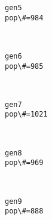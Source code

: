 \documentclass[11pt]{article}
\begin{document}
    \begin{Verbatim}[commandchars=\\\{\}]
gen5
pop\#=984

    \end{Verbatim}

    \begin{center}
    \end{center}
    { \hspace*{\fill} \\}
    
    \begin{Verbatim}[commandchars=\\\{\}]
gen6
pop\#=985

    \end{Verbatim}

    \begin{center}
    \end{center}
    { \hspace*{\fill} \\}
    
    \begin{Verbatim}[commandchars=\\\{\}]
gen7
pop\#=1021

    \end{Verbatim}

    \begin{center}
    \end{center}
    { \hspace*{\fill} \\}
    
    \begin{Verbatim}[commandchars=\\\{\}]
gen8
pop\#=969

    \end{Verbatim}

    \begin{center}
    \end{center}
    { \hspace*{\fill} \\}
    
    \begin{Verbatim}[commandchars=\\\{\}]
gen9
pop\#=888

    \end{Verbatim}
\end{document}
